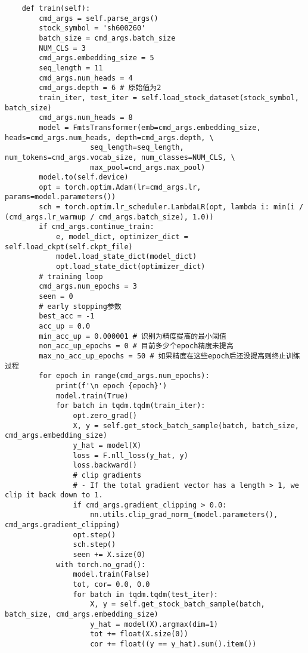 \begin{lstlisting}
    def train(self):
        cmd_args = self.parse_args()
        stock_symbol = 'sh600260'
        batch_size = cmd_args.batch_size
        NUM_CLS = 3
        cmd_args.embedding_size = 5
        seq_length = 11
        cmd_args.num_heads = 4
        cmd_args.depth = 6 # 原始值为2
        train_iter, test_iter = self.load_stock_dataset(stock_symbol, batch_size)
        cmd_args.num_heads = 8
        model = FmtsTransformer(emb=cmd_args.embedding_size, heads=cmd_args.num_heads, depth=cmd_args.depth, \
                    seq_length=seq_length, num_tokens=cmd_args.vocab_size, num_classes=NUM_CLS, \
                    max_pool=cmd_args.max_pool)
        model.to(self.device)
        opt = torch.optim.Adam(lr=cmd_args.lr, params=model.parameters())
        sch = torch.optim.lr_scheduler.LambdaLR(opt, lambda i: min(i / (cmd_args.lr_warmup / cmd_args.batch_size), 1.0))
        if cmd_args.continue_train:
            e, model_dict, optimizer_dict = self.load_ckpt(self.ckpt_file)
            model.load_state_dict(model_dict)
            opt.load_state_dict(optimizer_dict)
        # training loop
        cmd_args.num_epochs = 3
        seen = 0
        # early stopping参数
        best_acc = -1
        acc_up = 0.0
        min_acc_up = 0.000001 # 识别为精度提高的最小阈值
        non_acc_up_epochs = 0 # 目前多少个epoch精度未提高
        max_no_acc_up_epochs = 50 # 如果精度在这些epoch后还没提高则终止训练过程
        for epoch in range(cmd_args.num_epochs):
            print(f'\n epoch {epoch}')
            model.train(True)
            for batch in tqdm.tqdm(train_iter):
                opt.zero_grad()
                X, y = self.get_stock_batch_sample(batch, batch_size, cmd_args.embedding_size)
                y_hat = model(X)
                loss = F.nll_loss(y_hat, y)
                loss.backward()
                # clip gradients
                # - If the total gradient vector has a length > 1, we clip it back down to 1.
                if cmd_args.gradient_clipping > 0.0:
                    nn.utils.clip_grad_norm_(model.parameters(), cmd_args.gradient_clipping)
                opt.step()
                sch.step()
                seen += X.size(0)
            with torch.no_grad():
                model.train(False)
                tot, cor= 0.0, 0.0 
                for batch in tqdm.tqdm(test_iter):
                    X, y = self.get_stock_batch_sample(batch, batch_size, cmd_args.embedding_size)
                    y_hat = model(X).argmax(dim=1)
                    tot += float(X.size(0))
                    cor += float((y == y_hat).sum().item())

\end{lstlisting}
